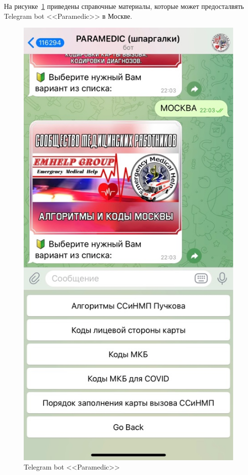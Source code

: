 \begin{enumerate}
    На рисунке~\ref{fig:fig05} приведены справочные материалы, которые может предосталвять Telegram bot <<Paramedic>> в Москве.
    \begin{figure}
        \includegraphics[scale=0.6]{styles/diploma/inc/prog2_1.jpeg}
        \caption{Telegram bot <<Paramedic>>}
        \label{fig:fig05}
    \end{figure}


\end{enumerate}
